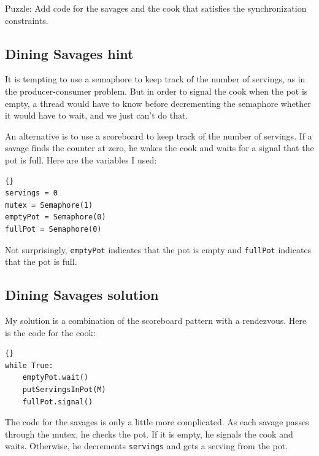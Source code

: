 \documentclass{book}
\newcommand{\clearemptydoublepage}{\newpage\cleardoublepage}
\begin{document}
Puzzle: Add code for the savages and the cook that
satisfies the synchronization constraints.


\clearemptydoublepage
\subsection{Dining Savages hint}

It is tempting to use a semaphore to keep track of the number of
servings, as in the producer-consumer problem.  But in order to signal
the cook when the pot is empty, a thread would have to know before
decrementing the semaphore whether it would have to wait, and we just
can't do that.

An alternative is to use a scoreboard to
keep track of the number of servings.  If a savage finds
the counter at zero, he wakes the cook and waits for a signal
that the pot is full.  Here are the variables I used:

\begin{latin}
\begin{latin}
\begin{lstlisting}[title={Dining Savages hint}]{}
servings = 0
mutex = Semaphore(1)
emptyPot = Semaphore(0)
fullPot = Semaphore(0)
\end{lstlisting}
\end{latin}
\end{latin}

Not surprisingly, {\tt emptyPot} indicates that the pot is empty and
{\tt fullPot} indicates that the pot is full.

\clearemptydoublepage
\subsection{Dining Savages solution}

My solution is a combination of the scoreboard pattern
with a rendezvous.
Here is the code for the cook:

\begin{latin}
\begin{latin}
\begin{lstlisting}[title={Dining Savages solution (cook)}]{}
while True:
    emptyPot.wait()
    putServingsInPot(M)
    fullPot.signal()
\end{lstlisting}
\end{latin}
\end{latin}

The code for the savages is only a little more complicated.
As each savage passes through the mutex, he checks the pot.
If it is empty, he signals the cook and waits.  Otherwise,
he decrements {\tt servings} and gets a serving from the pot.
\end{document}
